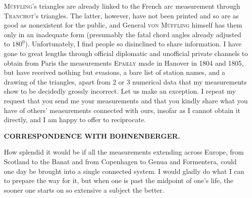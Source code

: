 \textsc{Müffling}'s triangles are already linked to the French arc measurement through \textsc{Tranchot}'s triangles. The latter, however, have not been printed and so are as good as nonexistent for the public, and General \textsc{von Müffling} himself has them only in an inadequate form (presumably the fatal chord angles already adjusted to \(180^{0}\)).
Unfortunately, I find people so disinclined to share information. I have gone to great lengths through official diplomatic and unofficial private channels to obtain from Paris the measurements \textsc{Epailly} made in Hanover in 1804 and 1805, but have received nothing but evasions, a bare list of station names, and a drawing of the triangles, apart from 2 or 3 numerical data that my measurements show to be decidedly grossly incorrect.
Let us make an exception.
I repeat my request that you send me your measurements and that you kindly share what you have of others' measurements connected with ours, insofar as I cannot obtain it directly, and I am happy to offer to reciprocate.
\par\clearpage
\noindent{}\hfill{\small\textbf{CORRESPONDENCE WITH BOHNENBERGER.}}\hfill\null\par\medskip
\noindent How splendid it would be if all the measurements extending across Europe, from Scotland to the Banat and from Copenhagen to Genua and Formentera, could one day be brought into a single connected system.
I would gladly do what I can to prepare the way for it, but when one is past the midpoint of one's life, the sooner one starts on so extensive a subject the better.

